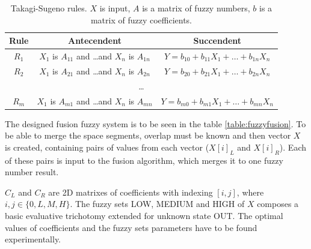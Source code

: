 \begin{table}[h!]
\begin{center}
\begin{tabular}{|c|c|c|} \hline
\textbf{Rule}   & \textbf{Antecendent}                                & \textbf{Succendent}                             \\ \hline
$R_1$           & $X_1$ is $A_{11}$ and \dots and $X_n$ is $A_{1n}$   & $Y = b_{10} + b_{11}X_1 + \dots + b_{1n}X_n$    \\ \hline
$R_2$           & $X_1$ is $A_{21}$ and \dots and $X_n$ is $A_{2n}$   & $Y = b_{20} + b_{21}X_1 + \dots + b_{2n}X_n$    \\ \hline
\multicolumn{3}{|c|}{\dots}                                                                                             \\ \hline
$R_m$           & $X_1$ is $A_{m1}$ and \dots and $X_n$ is $A_{mn}$   & $Y = b_{m0} + b_{m1}X_1 + \dots + b_{mn}X_n$    \\ \hline
\end{tabular}
\caption{Takagi-Sugeno rules. $X$ is input, $A$ is a matrix of fuzzy numbers, $b$ is a matrix of fuzzy coefficients.\label{table:takagisugeno} \cite{InsightIntoFuzzyModelling}}
\end{center}
\end{table}

The designed fusion fuzzy system is to be seen in the table \ref{table:fuzzyfusion}. To be able to merge
the space segments, overlap must be known and then vector $X$ is created, containing pairs of values
from each vector ($X[i]_L$ and $X[i]_R$). Each of these pairs is input to the fusion algorithm, which
merges it to one fuzzy number result. 

$C_{L}$ and $C_{R}$ are 2D matrixes of coefficients with indexing $[i,j]$, where $i,j \in \{0,L,M,H\}$.
The fuzzy sets LOW, MEDIUM and HIGH of $X$ composes a basic evaluative trichotomy extended for unknown state OUT.
The optimal values of coefficients and the fuzzy sets parameters have to be found experimentally. 

